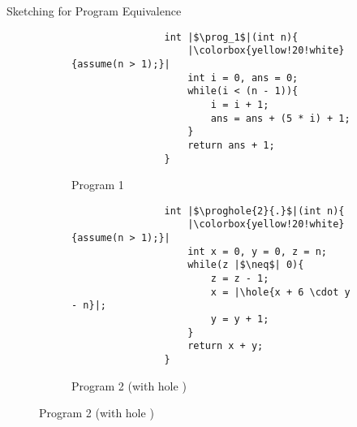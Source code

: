 \begin{frame}[fragile]{Sketching for Program Equivalence}
    \begin{figure}[t]
        \begin{subfigure}{0.48\textwidth}
            \begin{verbatim}
                int |$\prog_1$|(int n){
                    |\colorbox{yellow!20!white}{assume(n > 1);}|
                    int i = 0, ans = 0;
                    while(i < (n - 1)){
                        i = i + 1;
                        ans = ans + (5 * i) + 1;
                    }
                    return ans + 1;
                }
            \end{verbatim}
            \caption{Program 1 \label{list:p1}}
        \end{subfigure}
        \begin{subfigure}{0.48\textwidth}
            \begin{verbatim}
                int |$\proghole{2}{.}$|(int n){
                    |\colorbox{yellow!20!white}{assume(n > 1);}|
                    int x = 0, y = 0, z = n;
                    while(z |$\neq$| 0){
                        z = z - 1;
                        x = |\hole{x + 6 \cdot y - n}|;
                        y = y + 1;
                    }
                    return x + y;
                }
            \end{verbatim}
            \caption{Program 2 (with hole \hole{\cdot})\label{list:p2}}
        \end{subfigure}
    \end{figure}
\end{frame}
